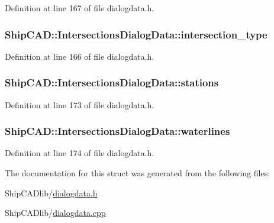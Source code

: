 Definition at line 167 of file dialogdata.\+h.

\subsubsection[{\texorpdfstring{intersection\+\_\+type}{intersection_type}}]{ Ship\+C\+A\+D\+::\+Intersections\+Dialog\+Data\+::intersection\+\_\+type}\hypertarget{structShipCAD_1_1IntersectionsDialogData_a45fdbb695bb58187c24037aba1eabca6}{}\label{structShipCAD_1_1IntersectionsDialogData_a45fdbb695bb58187c24037aba1eabca6}


Definition at line 166 of file dialogdata.\+h.

\subsubsection[{\texorpdfstring{stations}{stations}}]{ Ship\+C\+A\+D\+::\+Intersections\+Dialog\+Data\+::stations}\hypertarget{structShipCAD_1_1IntersectionsDialogData_a15b25bd4167a7eb4bc24240f98ec83ad}{}\label{structShipCAD_1_1IntersectionsDialogData_a15b25bd4167a7eb4bc24240f98ec83ad}


Definition at line 173 of file dialogdata.\+h.

\subsubsection[{\texorpdfstring{waterlines}{waterlines}}]{ Ship\+C\+A\+D\+::\+Intersections\+Dialog\+Data\+::waterlines}\hypertarget{structShipCAD_1_1IntersectionsDialogData_a239c93bd2e10930a0b73fa4a491b3332}{}\label{structShipCAD_1_1IntersectionsDialogData_a239c93bd2e10930a0b73fa4a491b3332}


Definition at line 174 of file dialogdata.\+h.



The documentation for this struct was generated from the following files\+:\begin{DoxyCompactItemize}
\item 
Ship\+C\+A\+Dlib/\hyperlink{dialogdata_8h}{dialogdata.\+h}\item 
Ship\+C\+A\+Dlib/\hyperlink{dialogdata_8cpp}{dialogdata.\+cpp}\end{DoxyCompactItemize}
